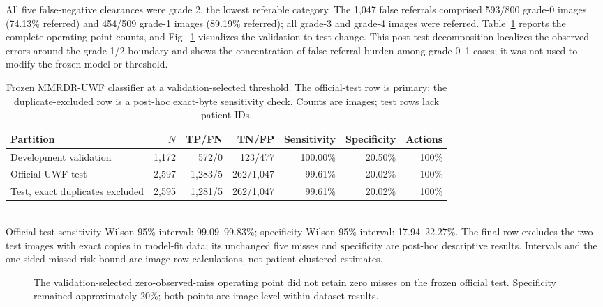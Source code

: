\documentclass[11pt]{article}
\begin{document}
All five false-negative clearances were grade 2, the lowest referable category. The 1,047 false referrals comprised 593/800 grade-0 images (74.13\% referred) and 454/509 grade-1 images (89.19\% referred); all grade-3 and grade-4 images were referred. Table~\ref{tab:mmrdr-test} reports the complete operating-point counts, and Fig.~\ref{fig:mmrdr-operating-transfer} visualizes the validation-to-test change. This post-test decomposition localizes the observed errors around the grade-1/2 boundary and shows the concentration of false-referral burden among grade 0--1 cases; it was not used to modify the frozen model or threshold.

\begin{table}[t]
\centering
\caption{Frozen MMRDR-UWF classifier at a validation-selected threshold. The official-test row is primary; the duplicate-excluded row is a post-hoc exact-byte sensitivity check. Counts are images; test rows lack patient IDs.}
\label{tab:mmrdr-test}
\small
\begin{tabular}{lrrrrrr}
\toprule
Partition & $N$ & TP/FN & TN/FP & Sensitivity & Specificity & Actions \\
\midrule
Development validation & 1,172 & 572/0 & 123/477 & 100.00\% & 20.50\% & 100\% \\
Official UWF test & 2,597 & 1,283/5 & 262/1,047 & 99.61\% & 20.02\% & 100\% \\
Test, exact duplicates excluded & 2,595 & 1,281/5 & 262/1,047 & 99.61\% & 20.02\% & 100\% \\
\bottomrule
\end{tabular}
\\[2pt]
\footnotesize Official-test sensitivity Wilson 95\% interval: 99.09--99.83\%; specificity Wilson 95\% interval: 17.94--22.27\%. The final row excludes the two test images with exact copies in model-fit data; its unchanged five misses and specificity are post-hoc descriptive results. Intervals and the one-sided missed-risk bound are image-row calculations, not patient-clustered estimates.
\end{table}

\begin{figure}[t]
\centering
{}
\caption{The validation-selected zero-observed-miss operating point did not retain zero misses on the frozen official test. Specificity remained approximately 20\%; both points are image-level within-dataset results.}
\label{fig:mmrdr-operating-transfer}
\end{figure}
\end{document}
